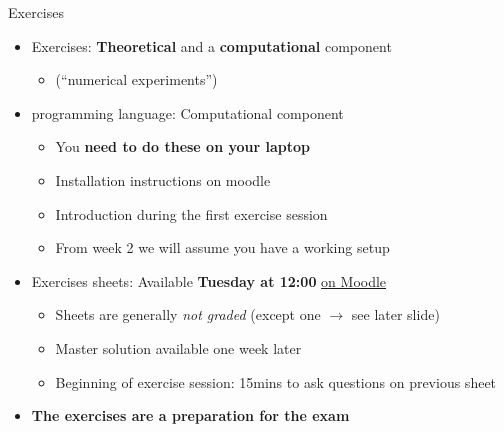 \begin{frame}{Exercises}
    \begin{itemize}
        \item Exercises: \textbf{Theoretical}
            and a \textbf{computational} component
            \begin{itemize}
                \vspace{-0.3em}
                \item \textcolor{grey5}{(``numerical experiments'')}
            \end{itemize}
        \vspace{0.5em}
        \item \julia programming language: Computational component
            \begin{itemize}
                \vspace{-0.2em}
                \item You \textbf{need to do these on your laptop}
                \vspace{-0.2em}
                \item Installation instructions on moodle
                \vspace{-0.2em}
                \item Introduction during the first exercise session
                \vspace{-0.2em}
                \item \alert{From week 2} we will assume you have a working setup
            \end{itemize}
        \vspace{1em}
        \item Exercises sheets: Available \textbf{Tuesday at 12:00}
            \alert{\href{https://go.epfl.ch/numerical-analysis}{on Moodle}}
            \begin{itemize}
                \vspace{-0.2em}
                \item Sheets are generally \textit{not graded}
                    \textcolor{grey5}{(except one $\rightarrow$ see later slide)}
                \vspace{-0.2em}
                \item Master solution available one week later
                \vspace{-0.2em}
                \item Beginning of exercise session:
                    \alert{15mins} to ask questions on previous sheet
            \end{itemize}
        \vspace{1em}
        \item \textbf{The exercises are a preparation for the exam}
    \end{itemize}
\end{frame}

